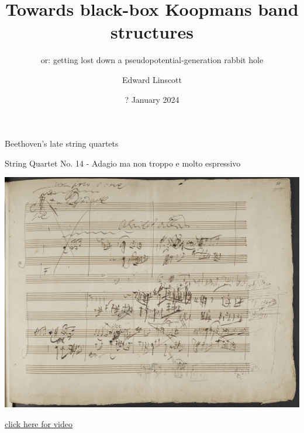 \documentclass[xcolor=table,aspectratio=169]{beamer}
\author{Edward Linscott}
\institute{PSI}
\date{? January 2024}
\title{Towards black-box Koopmans band structures}
\subtitle{or: getting lost down a pseudopotential-generation rabbit hole}
\numberwithin{equation}{section}
\begin{document}
\begin{frame}{Beethoven's late string quartets}
    \centering

    String Quartet No. 14 - Adagio ma non troppo e molto espressivo

    \vspace{6pt}

    \includegraphics[height=0.6\paperheight]{photos/beethoven.jpg}

    {\tiny \href{https://www.youtube.com/watch?v=JE_crvhG3Co\&t=454s\&ab_channel=DavidSukonick\#t=4m27s}{click here for video}}



\end{frame}

\frame{\titlepage}
\end{document}
